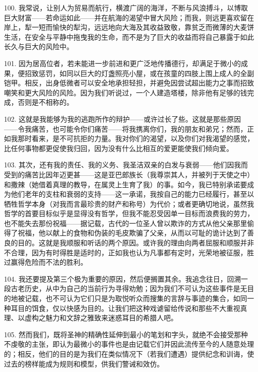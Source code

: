 100. 我常说，让别人为贸易而航行，横渡广阔的海洋，不断与风浪搏斗，以博取巨大财富——若命运如此——并在航海的渴望中冒大风险；而我，则远更喜欢留在岸上，犁一短而愉快的犁沟，远远地向大海及其收益致敬，靠贫乏而微薄的大麦饼生活，在安全与平静中拖曳我的生命，而不是为了巨大的收益而将自己暴露于如此长久与巨大的风险中。\par

101. 因为居高位者，若未能进一步前进和更广泛地传播德行，却满足于微小的成果，便招致惩罚，如同以巨大的灯盏照亮小屋，或在孩童的四肢上围上成人的全副铠甲。相反，出身低微者可以安全地承担轻担，并避免因尝试超出能力之事而招致嘲笑和更大风险的风险。因为我们听说过，一个人建造塔楼，除非他有足够的钱完成，否则是不相称的。\par

102. 这就是我能够为我的逃跑所作的辩护——或许过长了些。这就是那些原因——令我痛苦，也可能令你们痛苦——将我携离你们，我的朋友和弟兄；然而，正如我那时看来，是不可抗拒的力量。我对你们的渴望，以及你们对我渴望的感觉，比任何事物都更促使我归回，因为没有什么比相互的爱更能使我们倾向爱。\par

103. 其次，还有我的责任、我的义务、我圣洁双亲的白发与衰弱——他们因我而受到的痛苦比因年迈更甚——这是亚巴郎族长（我尊崇其人，并被列于天使之中）和撒辣（她借着真理的教导，在属灵上生育了我）的事。如今，我已特别承诺要成为他们老年的支柱和衰弱的支持——这一承诺，我按自己的能力已经履行，甚至以牺牲哲学本身（对我而言最珍贵的财产和称号）为代价；或者更确切地说，虽然我哲学的首要目标似乎是显得没有哲学，但我不能忍受因单一目标而浪费我的劳力，也不能失去那份祝福——据记载，古代的一位圣人曾以欺诈的方式从他父亲那里偷得了祝福，他以献上的食物和伪装的毛皮欺骗了父亲，从而以可耻的诡计达到了善良的目的。这就是我顺服和听话的两个原因。或许我的理由向两者屈服和顺服并非不合理，因为有时得胜是适时的，正如我也认为凡事都有定时，光荣地被征服，胜过赢得危险而不法的胜利。\par

104. 我还要提及第三个极为重要的原因，然后便搁置其余。我追念往日，回溯一段古老历史，从中为自己的当前行为寻得劝勉；因为我们不可认为这些事件是无目的地被记载，也不可认为它们只是为取悦听众而搜集的言辞与事迹的集合，如同一种耳目的饵食，仅以快感为目的。让我们把这种戏谑留给传说和那些不大重视真理、以虚构之魅力和文辞之雅致来迷惑耳目的希腊人吧。\par

105. 然而我们，既将圣神的精确性延伸到最小的笔划和字头，就绝不会接受那种不虔敬的主张，即认为最微小的事件也是由记载它们并因此流传至今的人随意处理的；相反，他们的目的是为我们在类似情况下（若我们遭遇）提供纪念和训诲，使过去的榜样能成为规则和模型，供我们警诫和效仿。\par

